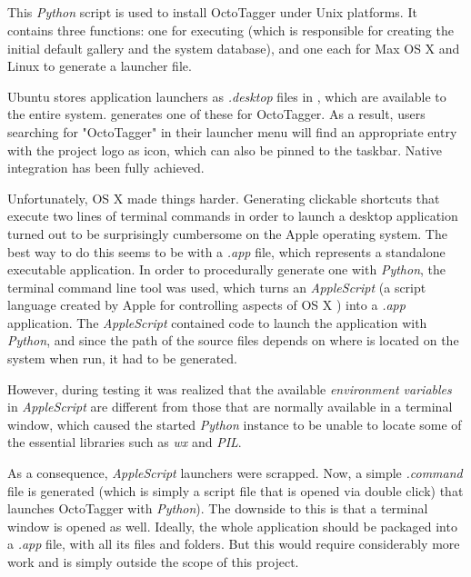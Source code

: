 \subsection{}
\label{sub:mod:install}
\def\kapitelautor{Erik Ritschl}

This \emph{Python} script is used to install OctoTagger under Unix platforms. It contains three functions: one for executing  (which is responsible for creating the initial default gallery and the system database), and one each for Max OS X and Linux to generate a launcher file.

Ubuntu stores application launchers as \emph{.desktop} files  in , which are available to the entire system.  generates one of these for OctoTagger. As a result, users searching for "OctoTagger" in their launcher menu will find an appropriate entry with the project logo as icon, which can also be pinned to the taskbar. Native integration has been fully achieved.

Unfortunately, OS X made things harder. Generating clickable shortcuts that execute two lines of terminal commands in order to launch a desktop application turned out to be surprisingly cumbersome on the Apple operating system. The best way to do this seems to be with a \emph{.app} file, which represents a standalone executable application. In order to procedurally generate one with \emph{Python}, the terminal command line tool  was used, which turns an \emph{AppleScript} (a script language created by Apple for controlling aspects of OS X \cite{AppleScript}) into a \emph{.app} application. The \emph{AppleScript} contained code to launch the application with \emph{Python}, and since the path of the source files depends on where  is located on the system when run, it had to be generated. 

However, during testing it was realized that the available \emph{environment variables} \cite{EnvironmentVariables} in \emph{AppleScript} are different from those that are normally available in a terminal window, which caused the started \emph{Python} instance to be unable to locate some of the essential libraries such as \emph{wx} and \emph{PIL}.

As a consequence, \emph{AppleScript} launchers were scrapped. Now, a simple \emph{.command} file is generated (which is simply a script file that is opened via double click) that launches OctoTagger with \emph{Python}). The downside to this is that a terminal window is opened as well. Ideally, the whole application should be packaged into a \emph{.app} file, with all its files and folders. But this would require considerably more work and is simply outside the scope of this project.